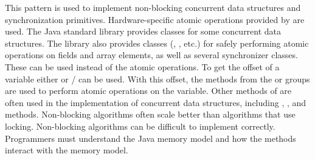 %
{
  This pattern is used to implement
  non-blocking concurrent data structures and synchronization primitives.
  Hardware-specific atomic operations
  provided by \smu{} are used.
}
{The Java standard library provides classes for some concurrent data structures.
The library also provides classes
(, , etc.)
for safely performing atomic operations on fields and array elements, as well
as several synchronizer classes. These
can be used instead of the \unsafe{} atomic operations.}
{To get the offset of a \java{} variable either  or
  / can be used.
With this offset, the methods from the  or  groups are used to perform atomic operations on the variable.
Other methods of \unsafe{} are often used in the implementation of concurrent
data structures, including , , and  methods.
}
{Non-blocking algorithms often scale better than algorithms that use locking.}
{Non-blocking algorithms can be difficult to implement correctly. Programmers
must understand the Java memory model and how the \unsafe{} methods interact
with the memory model.}

\newcommand\foundinfence{198}
\newcommand\usedbyfence{9795}
\newcommand\mostusedfence{\fencemost}
\newcommand\membersfence{Methods of the \smugroup{Fence} group, or methods of
the \smugroup{Get/Put Volatile} groups or \smugroup{Put Ordered} group}
\newcommand\namefence{Strongly Consistent Shared Variables}


